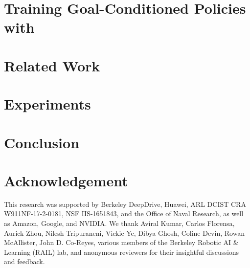 \documentclass{article} %
\begin{document}
\section{Training Goal-Conditioned Policies with \METHOD}
\label{sec:train-policy}


\section{Related Work}\label{sec:related_work}


\section{Experiments}\label{sec:experiments}


\section{Conclusion}\label{sec:conclusion}


\section{Acknowledgement}
This research was supported by Berkeley DeepDrive, Huawei, ARL DCIST CRA W911NF-17-2-0181, NSF IIS-1651843, and the Office of Naval Research, as well as Amazon, Google, and NVIDIA.
We thank Aviral Kumar, Carlos Florensa, Aurick Zhou, Nilesh Tripuraneni, Vickie Ye, Dibya Ghosh, Coline Devin, Rowan McAllister, John D. Co-Reyes, various members of the Berkeley Robotic AI \& Learning (RAIL) lab, and anonymous reviewers for their insightful discussions and feedback.

{\small


}

\clearpage
\newpage

\end{document}
